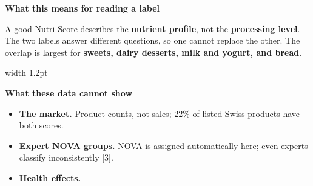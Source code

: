 \documentclass{article}
\begin{document}
\vspace{10pt}
\begin{tcolorbox}[enhanced,colback=ink,colframe=ink,arc=6pt,boxrule=0pt,left=26pt,right=26pt,top=18pt,bottom=18pt,boxsep=0pt]
\color{white}
\begin{minipage}[t]{0.555\linewidth}\vspace{0pt}
{\fontsize{25}{30}\selectfont\bfseries What this means for reading a label\par}\vspace{8pt}
{\fontsize{20}{26}\selectfont A good Nutri-Score describes the \textbf{nutrient profile}, not the \textbf{processing level}. The two labels answer different questions, so one cannot replace the other. The overlap is largest for \textbf{sweets, dairy desserts, milk and yogurt, and bread}.\par}
\end{minipage}\hfill
{\color{white!35!ink}\vrule width 1.2pt}\hfill
\begin{minipage}[t]{0.39\linewidth}\vspace{0pt}
{\fontsize{25}{30}\selectfont\bfseries What these data cannot show\par}\vspace{8pt}
{\fontsize{18.5}{23.5}\selectfont
\begin{itemize}[label={\color{white!60!ink}\textbullet},itemsep=6pt]
\item \textbf{The market.} Product counts, not sales; 22\% of listed Swiss products have both scores.
\item \textbf{Expert NOVA groups.} NOVA is assigned automatically here; even experts classify inconsistently [3].
\item \textbf{Health effects.}
\end{itemize}\par}
\end{minipage}
\end{tcolorbox}
\end{document}
